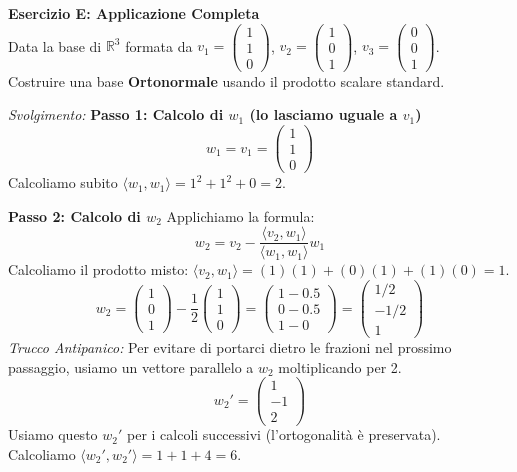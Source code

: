 \documentclass[10pt,a4paper]{article}
\begin{document}
\vspace{0.4cm}

\textbf{Esercizio E: Applicazione Completa}
\\ Data la base di $\mathbb{R}^3$ formata da $v_1 = \begin{pmatrix} 1 \\ 1 \\ 0 \end{pmatrix}$, $v_2 = \begin{pmatrix} 1 \\ 0 \\ 1 \end{pmatrix}$, $v_3 = \begin{pmatrix} 0 \\ 0 \\ 1 \end{pmatrix}$.
\\ Costruire una base \textbf{Ortonormale} usando il prodotto scalare standard.

\textit{Svolgimento:}
\textbf{Passo 1: Calcolo di $w_1$ (lo lasciamo uguale a $v_1$)}
\[ w_1 = v_1 = \begin{pmatrix} 1 \\ 1 \\ 0 \end{pmatrix} \]
Calcoliamo subito $\langle w_1, w_1 \rangle = 1^2 + 1^2 + 0 = 2$.

\textbf{Passo 2: Calcolo di $w_2$}
Applichiamo la formula:
\[ w_2 = v_2 - \frac{\langle v_2, w_1 \rangle}{\langle w_1, w_1 \rangle} w_1 \]
Calcoliamo il prodotto misto: $\langle v_2, w_1 \rangle = (1)(1) + (0)(1) + (1)(0) = 1$.
\[ w_2 = \begin{pmatrix} 1 \\ 0 \\ 1 \end{pmatrix} - \frac{1}{2} \begin{pmatrix} 1 \\ 1 \\ 0 \end{pmatrix} = \begin{pmatrix} 1 - 0.5 \\ 0 - 0.5 \\ 1 - 0 \end{pmatrix} = \begin{pmatrix} 1/2 \\ -1/2 \\ 1 \end{pmatrix} \]
\textit{Trucco Antipanico:} Per evitare di portarci dietro le frazioni nel prossimo passaggio, usiamo un vettore parallelo a $w_2$ moltiplicando per 2.
\[ w_2' = \begin{pmatrix} 1 \\ -1 \\ 2 \end{pmatrix} \]
Usiamo questo $w_2'$ per i calcoli successivi (l'ortogonalità è preservata).
Calcoliamo $\langle w_2', w_2' \rangle = 1 + 1 + 4 = 6$.
\end{document}
